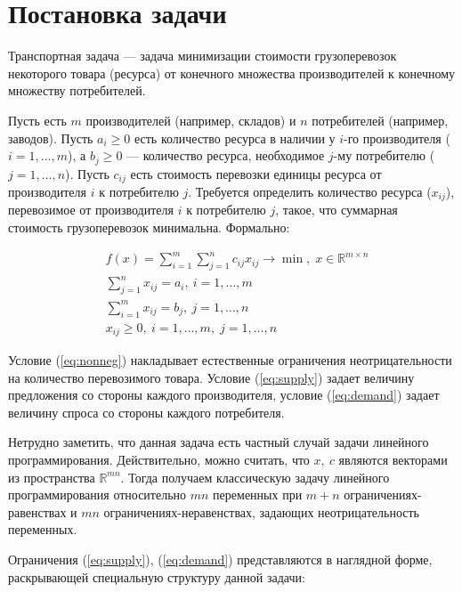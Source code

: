 \documentclass[12pt]{article}
\theoremstyle{definition}
\theoremstyle{plain}
\theoremstyle{definition}
\begin{document}
\cwPutTitleContents

\section{Постановка задачи}

Транспортная задача --- задача минимизации стоимости грузоперевозок некоторого товара (ресурса)
от конечного множества производителей к конечному множеству потребителей.

Пусть есть $m$ производителей (например, складов) и $n$ потребителей (например, заводов).
Пусть $a_i \geq 0$ есть количество ресурса в наличии у $i$-го производителя ($i = 1,\dots,m$),
а $b_j \geq 0$ --- количество ресурса, необходимое $j$-му потребителю ($j = 1,\dots,n$).
Пусть $c_{ij}$ есть стоимость перевозки единицы ресурса от производителя $i$ к потребителю $j$.
Требуется определить количество ресурса ($x_{ij}$), перевозимое от производителя $i$ к потребителю $j$,
такое, что суммарная стоимость грузоперевозок минимальна. Формально:

\begin{align}
&f(x) = \sum_{i=1}^{m} \sum_{j=1}^{n} c_{ij} x_{ij} \xrightarrow{} \min, \;x \in \mathbb{R}^{m \times n} \label{eq:objective} \\  
&\sum_{j=1}^{n} x_{ij} = a_i, \:i = 1,\dots,m \label{eq:supply} \\  
&\sum_{i=1}^{m} x_{ij} = b_j, \:j = 1,\dots,n \label{eq:demand} \\
&x_{ij} \ge 0, \: i=1,\dots,m,\; j=1,\dots,n \label{eq:nonneg}
\end{align}

Условие (\ref{eq:nonneg}) накладывает естественные ограничения
неотрицательности на количество перевозимого товара.
Условие (\ref{eq:supply}) задает величину предложения со стороны каждого производителя,
условие (\ref{eq:demand}) задает величину спроса со стороны каждого потребителя.

Нетрудно заметить, что данная задача есть частный случай задачи линейного программирования.
Действительно, можно считать, что $x,\:c$ являются векторами из пространства $\mathbb{R}^{mn}$.
Тогда получаем классическую задачу линейного программирования относительно
$mn$ переменных при $m + n$ ограничениях-равенствах и $mn$ ограничениях-неравенствах,
задающих неотрицательность переменных.

Ограничения (\ref{eq:supply}), (\ref{eq:demand}) представляются в наглядной форме, раскрывающей специальную структуру данной задачи:
\end{document}
